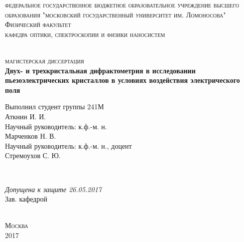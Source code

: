 \begin{titlepage}
  \begin{center}
    \textsc{\small \large федеральное государственное бюджетное образовательное
    учреждение высшего образования "московский государственный университет им. Ломоносова"}\\[0.3cm]
    \textsc{\large Физический факультет}\\[0.3cm]
    \textsc{\large кафедра оптики, спектроскопии и физики наносистем}\\[0.5cm]

    \begin{minipage}{\textwidth}
      \begin{flushleft}

      \end{flushleft}
    \end{minipage}\\[0.5cm]

    \textsc{\large  магистерская диссертация}\\[0.5cm]
    \textbf{\large Двух- и трехкристальная дифрактометрия в исследовании
    пьезоэлектрических кристаллов в условиях воздействия электрического поля}\\[1.5cm]


    \begin{minipage}{\textwidth}
      \begin{flushright}
        Выполнил студент группы 241М \hspace*{2.1cm} \\
        Аткнин И. И.\underline{\hspace*{4.6cm}}\\[0.5cm]
        Научный руководитель: к.ф.-м. н. \hspace*{1.8cm} \\
        Марченков Н. В. \underline{\hspace*{3.7cm}}\\[0.5cm]
        Научный руководитель: к.ф.-м. н., доцент\\
        Стремоухов С. Ю. \underline{\hspace*{3.7cm}}\\[0.5cm]
      \end{flushright}
    \end{minipage}\\[1.5cm]


    \begin{minipage}{\textwidth}
      \begin{flushleft}
        \textit{Допущена к защите 26.05.2017}\\
        Зав. кафедрой \underline{\hspace*{4.5cm}}\\
      \end{flushleft}
    \end{minipage}\\[1.5cm]

    \vfill
    \textsc{\small Москва\\ 2017}
  \end{center}
\end{titlepage}
